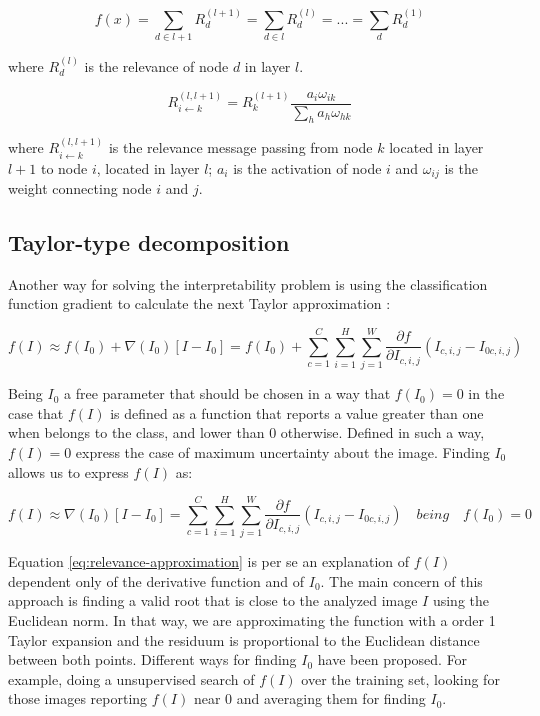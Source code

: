 \documentclass[review]{elsarticle}
\theoremstyle{definition} %
\theoremstyle{remark}
\begin{document}
\begin{equation}
	f(x) = \sum_{d \in l+1}R_d^{(l+1)} = \sum_{d \in l}R_d^{(l)} = ... = \sum_{d}R_d^{(1)}
	\label{eq:relevance-conservation}
\end{equation}

where $R_d^{(l)}$ is the relevance of node $d$ in layer $l$.

\begin{equation}
R_{i \leftarrow k}^{(l,l+1)} = R_k^{(l+1)} \frac{a_i \omega_{ik}}{\sum_{h} a_h \omega_{hk}}
\label{eq:relevance-message-value}
\end{equation}

where $R_{i \leftarrow k}^{(l,l+1)}$ is the relevance message passing from node $k$ located in layer $l+1$ to node $i$, located in layer $l$; $a_i$ is the activation of node $i$ and $\omega_{ij}$ is the weight connecting node $i$ and $j$.

\subsection{Taylor-type decomposition} 

Another way for solving the interpretability problem is using the classification function gradient to calculate the next Taylor approximation \cite{bach2015pixel}:

\begin{equation}
f(I) \approx f(I_0) + \nabla(I_0) [ I - I_0] = f(I_0) + \sum_{c=1}^C \sum_{i=1}^{H} \sum_{j=1}^W \frac{\partial f}{\partial I_{c,i,j}}(I_{c,i,j} - I_{0 c, i, j}) 
\label{eq:taylor}
\end{equation}

Being $I_0$ a free parameter that should be chosen in a way that $f(I_0) = 0$ in the case that $f(I)$ is defined as a function that reports a value greater than one when belongs to the class, and lower than 0 otherwise. Defined in such a way, $f(I) = 0$ express the case of maximum uncertainty about the image. Finding $I_0$ allows us to express $f(I)$ as:

\begin{equation}
f(I) \approx \nabla(I_0) [ I - I_0] = \sum_{c=1}^C \sum_{i=1}^{H} \sum_{j=1}^W \frac{\partial f}{\partial I_{c,i,j}}(I_{c,i,j} - I_{0 c, i, j}) \quad  being \quad f(I_0) = 0
\label{eq:relevance-approximation}
\end{equation}

Equation \ref{eq:relevance-approximation} is per se an explanation of $f(I)$ dependent only of the derivative function and of $I_0$. The main concern of this approach is finding a valid root that is close to the analyzed image $I$ using the Euclidean norm. In that way, we are approximating the function with a order 1 Taylor expansion and the residuum is proportional to the Euclidean distance between both points. Different ways for finding $I_0$ have been proposed. For example, doing a unsupervised search of $f(I)$ over the training set, looking for those images reporting $f(I)$ near 0 and averaging them for finding $I_0$.
\end{document}
